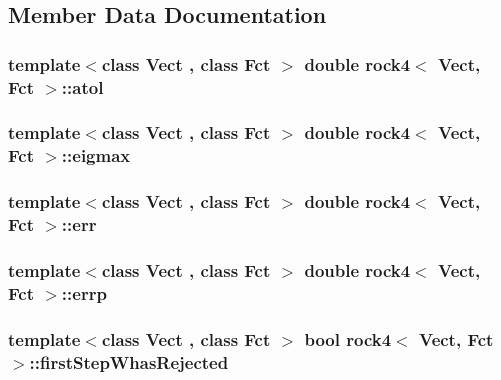 \subsection{Member Data Documentation}
\hypertarget{classrock4_a4f5a99fa4c2653e6e1d9fa7f67e77635}{
\subsubsection[{atol}]{\setlength{\rightskip}{0pt plus 5cm}template$<$class Vect , class Fct $>$ double {\bf rock4}$<$ Vect, Fct $>$\-::atol\hspace{0.3cm}{\ttfamily [private]}}}\label{classrock4_a4f5a99fa4c2653e6e1d9fa7f67e77635}
\hypertarget{classrock4_aa8b69310cc40c57eed61dcc4a65d8a91}{
\subsubsection[{eigmax}]{\setlength{\rightskip}{0pt plus 5cm}template$<$class Vect , class Fct $>$ double {\bf rock4}$<$ Vect, Fct $>$\-::eigmax\hspace{0.3cm}{\ttfamily [private]}}}\label{classrock4_aa8b69310cc40c57eed61dcc4a65d8a91}
\hypertarget{classrock4_aecd52981dee22a596cd85b3cbe6f1169}{
\subsubsection[{err}]{\setlength{\rightskip}{0pt plus 5cm}template$<$class Vect , class Fct $>$ double {\bf rock4}$<$ Vect, Fct $>$\-::err\hspace{0.3cm}{\ttfamily [private]}}}\label{classrock4_aecd52981dee22a596cd85b3cbe6f1169}
\hypertarget{classrock4_a52054b64f86911a9a1af16ee2911bf33}{
\subsubsection[{errp}]{\setlength{\rightskip}{0pt plus 5cm}template$<$class Vect , class Fct $>$ double {\bf rock4}$<$ Vect, Fct $>$\-::errp\hspace{0.3cm}{\ttfamily [private]}}}\label{classrock4_a52054b64f86911a9a1af16ee2911bf33}
\hypertarget{classrock4_afea690e04b3d36834f01c3d52c204fc1}{
\subsubsection[{first\-Step\-Whas\-Rejected}]{\setlength{\rightskip}{0pt plus 5cm}template$<$class Vect , class Fct $>$ bool {\bf rock4}$<$ Vect, Fct $>$\-::first\-Step\-Whas\-Rejected\hspace{0.3cm}{\ttfamily [private]}}}\label{classrock4_afea690e04b3d36834f01c3d52c204fc1}
